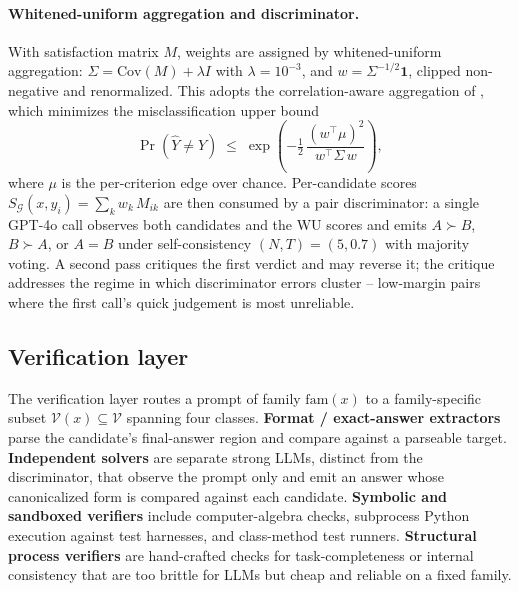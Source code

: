 \paragraph{Whitened-uniform aggregation and discriminator.}
With satisfaction matrix $M$, weights are assigned by whitened-uniform
aggregation: $\Sigma = \mathrm{Cov}(M) + \lambda I$ with
$\lambda{=}10^{-3}$, and $w = \Sigma^{-1/2}\mathbf{1}$, clipped
non-negative and renormalized.  This adopts the correlation-aware
aggregation of \citet{shen2026rrd}, which minimizes the
misclassification upper bound
%
\begin{equation}
\label{eq:wu-bound}
\Pr(\hat{Y}\neq Y) \;\leq\;
\exp\!\left(-\tfrac{1}{2}\,\frac{(w^{\!\top}\!\mu)^{2}}{w^{\!\top}\Sigma\,w}\right),
\end{equation}
%
where $\mu$ is the per-criterion edge over chance.  Per-candidate
scores $S_{\mathcal{G}}(x, y_i) = \sum_k w_k\, M_{ik}$ are then
consumed by a pair discriminator: a single GPT-4o call observes both
candidates and the WU scores and emits $A{\succ}B$, $B{\succ}A$, or
$A{=}B$ under self-consistency $(N, T){=}(5, 0.7)$ with majority
voting.  A second pass critiques the first verdict and may reverse
it; the critique addresses the regime in which discriminator errors
cluster -- low-margin pairs where the first call's quick judgement is
most unreliable.

\subsection{Verification layer}
\label{sec:verifiers}

The verification layer routes a prompt of family $\mathrm{fam}(x)$ to
a family-specific subset $\mathcal{V}(x) \subseteq \mathcal{V}$
spanning four classes.  \textbf{Format / exact-answer extractors}
parse the candidate's final-answer region and compare against a
parseable target.  \textbf{Independent solvers} are separate strong
LLMs, distinct from the discriminator, that observe the prompt only
and emit an answer whose canonicalized form is compared against each
candidate.  \textbf{Symbolic and sandboxed verifiers} include
computer-algebra checks, subprocess Python execution against test
harnesses, and class-method test runners.  \textbf{Structural process
verifiers} are hand-crafted checks for task-completeness or internal
consistency that are too brittle for LLMs but cheap and reliable on a
fixed family.

